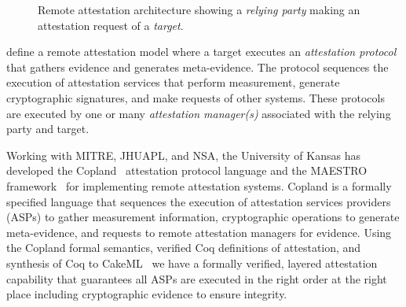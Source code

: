 \documentclass[runningheads]{llncs}
\begin{document}

\begin{figure}[hbtp]
  \centering
  \caption{Remote attestation architecture
  showing a \emph{relying party} making an attestation request of a
  \emph{target}.}
  \label{fig:remote-attestation}
\end{figure}

\citet{Coker::Principles-of-R,Coker:08:Attestation:-Ev} define a
remote attestation model where a target executes an \emph{attestation
  protocol} that gathers evidence and generates meta-evidence.  The
protocol sequences the execution of attestation services that perform
measurement, generate cryptographic signatures, and make requests of
other systems.  These protocols are executed by one or many \emph{attestation
  manager(s)} associated with the relying party and target.

Working with MITRE, JHUAPL, and NSA, the University of Kansas has
developed the Copland~\citep{Ramsdell:2019aa} attestation protocol language
and the MAESTRO framework~\citep{petz2022innovations} for implementing
remote attestation systems. Copland is a formally specified language
that sequences the execution of attestation services providers (ASPs)
to gather measurement information, cryptographic operations to
generate meta-evidence, and requests to remote attestation managers
for evidence. Using the Copland formal semantics, verified Coq
definitions of attestation, and synthesis of Coq to
CakeML~\citep{Kumar:2014:CVI:2535838.2535841} we have a formally
verified, layered attestation capability that guarantees all ASPs are
executed in the right order at the right place including cryptographic
evidence to ensure integrity.
\end{document}
